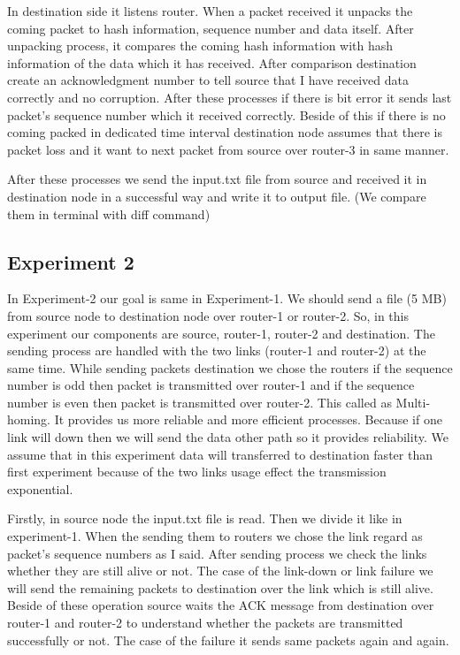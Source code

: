 \documentclass[letterpaper, 12 pt, conference]{ieeeconf}  %
\begin{document}
In destination side it listens router. When a packet received it unpacks the coming packet to hash information, sequence number and data itself. After unpacking process, it compares the coming hash information with hash information of the data which it has received. After comparison destination create an acknowledgment number to tell source that I have received data correctly and no corruption. After these processes if there is bit error it sends last packet’s sequence number which it received correctly. Beside of this if there is no coming packed in dedicated time interval destination node assumes that there is packet loss and it want to next packet from source over router-3 in same manner.
\vspace{1cm}

After these processes we send the input.txt file from source and received it in destination node in a successful way and write it to output file. (We compare them in terminal with diff command)
	
	\subsection{Experiment 2}
	
In Experiment-2 our goal is same in Experiment-1. We should send a file (5 MB) from source node to destination node over router-1 or router-2. So, in this experiment our components are source, router-1, router-2 and destination. The sending process are handled with the two links (router-1 and router-2) at the same time. While sending packets destination we chose the routers if the sequence number is odd then packet is transmitted over router-1 and if the sequence number is even then packet is transmitted over router-2. This called as Multi-homing. It provides us more reliable and more efficient processes. Because if one link will down then we will send the data other path so it provides reliability. We assume that in this experiment data will transferred to destination faster than first experiment because of the two links usage effect the transmission exponential.
\vspace{1cm}

Firstly, in source node the input.txt file is read. Then we divide it like in experiment-1. When the sending them to routers we chose the link regard as packet’s sequence numbers as I said. After sending process we check the links whether they are still alive or not. The case of the link-down or link failure we will send the remaining packets to destination over the link which is still alive. Beside of these operation source waits the ACK message from destination over router-1 and router-2 to understand whether the packets are transmitted successfully or not. The case of the failure it sends same packets again and again. 
\vspace{1cm}
\end{document}
